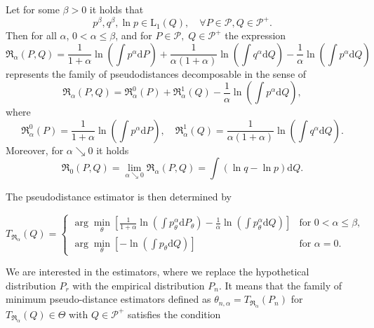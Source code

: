 \begin{theorem}
Let for some $\beta>0$ it holds that
	\begin{equation*}
			p^\beta, q^\beta,\ln{p} \in \mathrm{L}_1(Q), \quad \forall P \in \mathcal{P}, Q \in \mathcal{P^+}.
	\end{equation*}
	Then for all $\alpha$, $0 < \alpha \leq \beta$, and for $P \in \mathcal{P}, \; Q \in \mathcal{P^+} $ the expression
	\begin{equation}
		\mathfrak{R}_\alpha (P,Q) = \dfrac{1}{1+\alpha}\ln{\left( \int{p^\alpha \mathrm{d}P } \right)} +
		\dfrac{1}{\alpha (1+\alpha)}\ln{\left( \int{q^\alpha \mathrm{d}Q } \right)} -
		\dfrac{1}{\alpha} \ln{\left( \int{p^\alpha \mathrm{d}Q } \right)}
	\end{equation}
		represents the family of pseudodistances decomposable in the sense of
	\begin{equation*}
		\mathfrak{R}_\alpha (P,Q) = \mathfrak{R}_\alpha^0 (P) + \mathfrak{R}_\alpha^1 (Q) - \dfrac{1}{\alpha} \ln{\left( \int{p^\alpha \mathrm{d}Q } \right)},
	\end{equation*}	
	where
	\begin{equation*}
		\mathfrak{R}_\alpha^0 (P) = \dfrac{1}{1+\alpha}\ln{\left( \int{p^\alpha \mathrm{d}P } \right)}, \quad \mathfrak{R}_\alpha^1 (Q) = \dfrac{1}{\alpha (1+\alpha)}\ln{\left( \int{q^\alpha \mathrm{d}Q } \right)}.
	\end{equation*}
	Moreover, for $\alpha \searrow 0$ it holds
	\begin{equation*}
		\mathfrak{R}_0 (P,Q) = \lim_{\alpha \searrow 0} \mathfrak{R}_\alpha (P,Q) =  \int{\left( \ln{q} - \ln{p} \right)\mathrm{d}Q}.
	\end{equation*}
\end{theorem}

\noindent The \ren pseudodistance estimator is then determined by

\begin{equation}
	T_{\mathfrak{R}_\alpha}(Q) =
	\begin{cases}
		 \arg \min_{\theta} \left[\frac{1}{1+\alpha} \ln(\int p_\theta^\alpha\mathrm{d}P_\theta) - \frac{1}{\alpha} \ln(\int p_\theta^\alpha\mathrm{d}Q) \right] & \text{for } 0 < \alpha \leq \beta, \\
		 \arg \min_{\theta} \left[- \ln(\int p_\theta\mathrm{d}Q) \right] & \text{for } \alpha = 0.
	\end{cases}	
\end{equation}

We are interested in the estimators, where we replace the hypothetical distribution $P_r$ with the empirical distribution $P_n$. It means that the family of minimum \ren pseudo-distance estimators defined as $\theta_{n,\alpha} = T_{\mathfrak{R}_\alpha}(P_n)$ for $T_{\mathfrak{R}_\alpha}(Q) \in \Theta$ with $Q \in \mathcal{P}^+$ satisfies the condition

